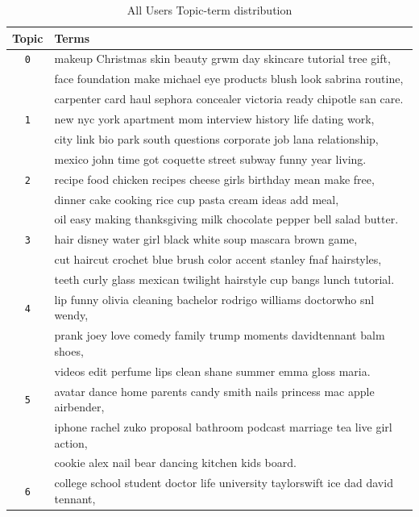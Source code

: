 \documentclass[acmtog]{acmart}
\begin{document}
\begin{table}[ht]
  \caption{All Users Topic-term distribution}
  \label{tab:context}
  \begin{tabular}{cl}
    \toprule
     Topic & Terms\\
    \midrule
    \texttt 0 & makeup Christmas skin beauty grwm day skincare tutorial tree gift,\\
    \texttt & face foundation make michael eye products blush look sabrina routine,\\
    \texttt & carpenter card haul sephora concealer victoria ready chipotle san care. \\    
    \texttt 1 & new nyc york apartment mom interview history life dating work, \\
    \texttt & city link bio park south questions corporate job lana relationship, \\
    \texttt & mexico john time got coquette street subway funny year living. \\
    \texttt 2 & recipe food chicken recipes cheese girls birthday mean make free, \\
    \texttt & dinner cake cooking rice cup pasta cream ideas add meal, \\
    \texttt & oil easy making thanksgiving milk chocolate pepper bell salad butter. \\
    \texttt 3 & hair disney water girl black white soup mascara brown game, \\
    \texttt & cut haircut crochet blue brush color accent stanley fnaf hairstyles, \\
    \texttt & teeth curly glass mexican twilight hairstyle cup bangs lunch tutorial. \\
    \texttt 4 & lip funny olivia cleaning bachelor rodrigo williams doctorwho snl wendy, \\
    \texttt & prank joey love comedy family trump moments davidtennant balm shoes, \\
    \texttt & videos edit perfume lips clean shane summer emma gloss maria. \\
    \texttt 5 & avatar dance home parents candy smith nails princess mac apple airbender, \\
    \texttt & iphone rachel zuko proposal bathroom podcast marriage tea live girl action, \\
    \texttt & cookie alex nail bear dancing kitchen kids board. \\
    \texttt 6 & college school student doctor life university taylorswift ice dad david tennant, \\

\end{tabular}
\end{table}
\end{document}
